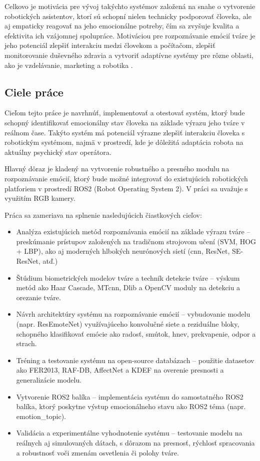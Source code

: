 Celkovo je motivácia pre vývoj takýchto systémov založená na snahe o vytvorenie robotických asistentov, ktorí sú schopní nielen technicky podporovať človeka, ale aj empaticky reagovať na jeho emocionálne potreby, čím sa zvyšuje kvalita a efektivita ich vzájomnej spolupráce.
Motiváciou pre rozpoznávanie emócií tváre je jeho potenciál zlepšiť interakciu medzi človekom a počítačom, zlepšiť monitorovanie duševného zdravia a vytvoriť adaptívne systémy pre rôzne oblasti, 
ako je vzdelávanie, marketing a robotika \cite{article01}.
\subsection{Ciele práce}
Cieľom tejto práce je navrhnúť, implementovať a otestovať systém, ktorý bude schopný identifikovať emocionálny stav človeka na základe výrazu jeho tváre v reálnom čase. Takýto systém má potenciál 
výrazne zlepšiť interakciu človeka s robotickým systémom, najmä v prostredí, kde je dôležitá adaptácia robota na aktuálny psychický stav operátora.

Hlavný dôraz je kladený na vytvorenie robustného a presného modulu na rozpoznávanie emócií, ktorý bude možné integrovať do existujúcich robotických platforiem v prostredí ROS2 (Robot Operating System 2). 
V práci sa uvažuje s využitím RGB kamery.

Práca sa zameriava na splnenie nasledujúcich čiastkových cieľov:

\begin{itemize}
    \item Analýza existujúcich metód rozpoznávania emócií na základe výrazu tváre – preskúmanie prístupov založených na tradičnom strojovom učení (SVM, HOG + LBP), ako aj moderných hlbokých neurónových sietí 
(\gls{cnn}, ResNet, SE-ResNet, atď.)

    \item Štúdium biometrických modelov tváre a techník detekcie tváre – výskum metód ako Haar Cascade, MT\gls{cnn}, Dlib a OpenCV moduly na detekciu a orezanie tváre.

    \item Návrh architektúry systému na rozpoznávanie emócií – vybudovanie modelu (napr. ResEmoteNet) využívajúceho konvolučné siete a reziduálne bloky, schopného klasifikovať emócie ako radosť, smútok, hnev, prekvapenie, 
odpor a strach.

    \item Tréning a testovanie systému na open-source databázach – použitie datasetov ako FER2013, RAF-DB, AffectNet a KDEF na overenie presnosti a generalizácie modelu.

    \item Vytvorenie ROS2 balíka – implementácia systému do samostatného ROS2 balíka, ktorý poskytne výstup emocionálneho stavu ako ROS2 téma (napr. emotion\_topic).

    \item Validácia a experimentálne vyhodnotenie systému – testovanie modelu na reálnych aj simulovaných dátach, s dôrazom na presnosť, rýchlosť spracovania a robustnosť voči zmenám osvetlenia či polohy tváre.
\end{itemize}


